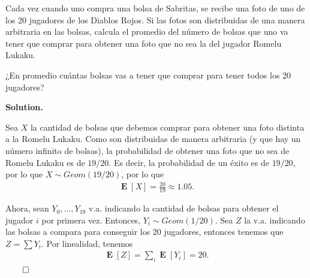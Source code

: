 \documentclass{article}
\theoremstyle{problemstyle}
\newenvironment{solution}{%
  \begin{mdframed}[linewidth=0.8pt,linecolor=Gray,backgroundcolor=Gray!5,roundcorner=5pt]%
  \noindent\textbf{Solution.}%
}{%
\hfill $ \qed $ 
  \end{mdframed}%
}
\DeclareMathOperator{\E}{\mathbf{E}}
\begin{document}
\pagebreak
\begin{problem}
Cada vez cuando uno compra una bolsa de Sabritas, se recibe una foto de uno de los 20 jugadores de los Diablos Rojos. Si las fotos son distribuidas de una manera arbitraria en las bolsas, calcula el promedio del n\'umero de bolsas que uno va tener que comprar para obtener una foto que no sea la del jugador Romelu Lukaku.

¿En promedio cu\'antas bolsas vas a tener que comprar para tener todos los 20 jugadores?
\end{problem}

\begin{solution}
	Sea $ X $ la cantidad de bolsas que debemos comprar para obtener una foto distinta a la Romelu Lukaku. Como son distribuidas de manera arbitraria (y que hay un n\'umero infinito de bolsas), la probabilidad de obtener una foto que no sea de Romelu Lukaku es de $ 19/20 $. Es decir, la probabilidad de un \'exito es de $ 19/20 $, por lo que $ X\sim Geom(19/20) $, por lo que
	\begin{align*}
		\E[X] = \frac{20}{19} \approx 1.05.
	\end{align*}

  Ahora, sean $ Y_0,\dots,Y_{19} $ v.a. indicando la cantidad de bolsas para obtener el jugador $ i $ por primera vez. Entonces, $ Y_i\sim Geom(1/20) $. Sea $ Z $ la v.a. indicando las bolsas a compara para conseguir los 20 jugadores, entonces tenemos que $ Z = \sum Y_i $. Por linealidad, tenemos
  \begin{align*}
    \E[Z] = \sum_i \E[Y_i] = 20.
  \end{align*}
\end{solution}



\end{document}
